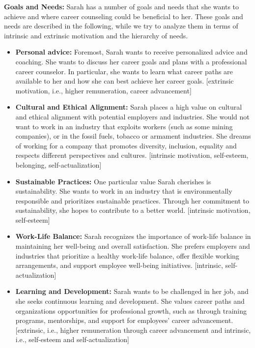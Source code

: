 \noindent\textbf{Goals and Needs:}
Sarah has a number of goals and needs that she wants to achieve and where career counseling could be beneficial to
her. These goals and needs are described in the following, while we try to analyze them in terms of intrinsic and
extrinsic motivation and the hierarchy of needs.

\begin{itemize}
    \item \textbf{Personal advice:}
        Foremost, Sarah wants to receive personalized advice and coaching. She wants to discuss her career goals and plans with a
        professional career counselor. In particular, she wants to learn what career paths are available to her and how she can best
        achieve her career goals. [extrinsic motivation, i.e., higher remuneration, career advancement]
    \item \textbf{Cultural and Ethical Alignment:}
        Sarah places a high value on cultural and ethical alignment with potential employers and industries. She would not want to work 
        in an industry that exploits workers (such as some mining companies), or in the fossil fuels, tobacco or armament industries. She
        dreams of working for a company that promotes diversity, inclusion, equality and respects different perspectives and cultures.
        [intrinsic motivation, self-esteem, belonging, self-actualization]
    \item \textbf{Sustainable Practices:} 
        One particular value Sarah cherishes is sustainability. She wants to work in an industry that is environmentally responsible and
        prioritizes sustainable practices. Through her commitment to sustainability, she hopes to contribute to a better world. [intrinsic
        motivation, self-esteem]
        \item \textbf{Work-Life Balance:}
        Sarah recognizes the importance of work-life balance in maintaining her well-being and overall satisfaction. She prefers
        employers and industries that prioritize a healthy work-life balance, offer flexible working arrangements, and support
        employee well-being initiatives. [intrinsic, self-actualization]
    \item \textbf{Learning and Development:}
        Sarah wants to be challenged in her job, and she seeks continuous learning and development. She values career paths and organizations
        opportunities for professional growth, such as through training programs, mentorships, and support for employees' career advancement.
        [extrinsic, i.e., higher remuneration through career advancement and intrinsic, i.e., self-esteem and self-actualization]
\end{itemize}

